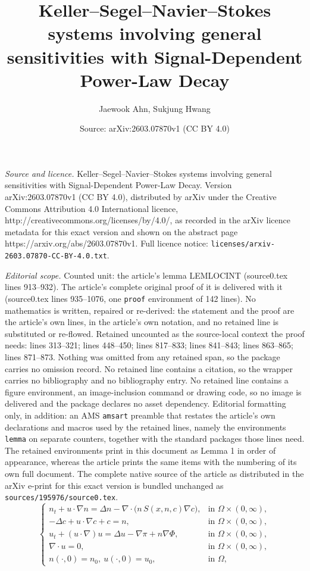 \documentclass[10pt,a4paper]{amsart}
\title{Keller--Segel--Navier--Stokes systems involving general sensitivities with Signal-Dependent Power-Law Decay}
\author{Jaewook Ahn, Sukjung Hwang}
\date{Source: arXiv:2603.07870v1 (CC BY 4.0)}
\begin{document}
\maketitle

\noindent\emph{Source and licence.} Keller--Segel--Navier--Stokes systems involving general sensitivities with Signal-Dependent Power-Law Decay. Version arXiv:2603.07870v1 (CC BY 4.0), distributed by arXiv under the Creative Commons Attribution 4.0 International licence, http://creativecommons.org/licenses/by/4.0/, as recorded in the arXiv licence metadata for this exact version and shown on the abstract page https://arxiv.org/abs/2603.07870v1. Full licence notice: \texttt{licenses/arxiv-2603.07870-CC-BY-4.0.txt}.\par\smallskip

\noindent\textit{Editorial scope.} Counted unit: the article's lemma LEMLOCINT (source0.tex lines 913--932). The article's complete original proof of it is delivered with it (source0.tex lines 935--1076, one \texttt{proof} environment of 142 lines). No mathematics is written, repaired or re-derived: the statement and the proof are the article's own lines, in the article's own notation, and no retained line is substituted or re-flowed.  Retained uncounted as the source-local context the proof needs: lines 313--321; lines 448--450; lines 817--833; lines 841--843; lines 863--865; lines 871--873.  Nothing was omitted from any retained span, so the package carries no omission record.  No retained line contains a citation, so the wrapper carries no bibliography and no bibliography entry.  No retained line contains a figure environment, an image-inclusion command or drawing code, so no image is delivered and the package declares no asset dependency.  Editorial formatting only, in addition: an AMS \texttt{amsart} preamble that restates the article's own declarations and macros used by the retained lines, namely the environments \texttt{lemma} on separate counters, together with the standard packages those lines need.  The retained environments print in this document as Lemma 1 in order of appearance, whereas the article prints the same items with the numbering of its own full document.  The complete native source of the article as distributed in the arXiv e-print for this exact version is bundled unchanged as \texttt{sources/195976/source0.tex}.
\begin{equation}\label{KS01}
\begin{cases}
n_t + u\cdot\nabla n = \Delta n - \nabla\cdot\bigl(n\,S(x,n,c)\nabla c\bigr), & \text{in } \Omega\times(0,\infty),\\
-\Delta c + u\cdot\nabla c + c = n, & \text{in } \Omega\times(0,\infty),\\
u_t + (u\cdot\nabla)u = \Delta u - \nabla\pi + n\nabla\Phi, & \text{in } \Omega\times(0,\infty),\\
\nabla\cdot u = 0, & \text{in } \Omega\times(0,\infty), \\
n(\cdot, 0)=n_0, \ u(\cdot, 0)=u_0, & \text{in } \Omega,
\end{cases}
\end{equation}
\end{document}
